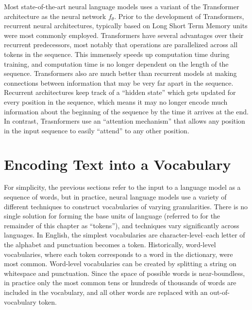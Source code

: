 Most state-of-the-art neural language models uses a variant of the Transformer architecture \cite{vaswani2017attention} as the neural network $f_\theta$.
Prior to the development of Transformers, recurrent neural architectures, typically based on Long Short Term Memory units \citep{hochreiter1997long} were most commonly employed.
Transformers have several advantages over their recurrent predecessors, most notably that operations are parallelized across all tokens in the sequence.
This immensely speeds up computation time during training, and computation time is no longer dependent on the length of the sequence.
Transformers also are much better than recurrent models at making connections between information that may be very far apart in the sequence.
Recurrent architectures keep track of a ``hidden state'' which gets updated for every position in the sequence, which means it may no longer encode much information about the beginning of the sequence by the time it arrives at the end.
In contrast, Trasnformers use an ``attention mechanism'' that allows any position in the input sequence to easily ``attend'' to any other position.


\section{Encoding Text into a Vocabulary}

For simplicity, the previous sections refer to the input to a language model as a sequence of words, but in practice, neural language models use a variety of different techniques to construct vocabularies of varying granularities.
There is no single solution for forming the base units of language (referred to for the remainder of this chapter as ``tokens''), and techniques vary significantly across languages.
In English, the simplest vocabularies are character-level--each letter of the alphabet and punctuation becomes a token.
Historically, word-level vocabularies, where each token corresponds to a word in the dictionary, were most common.
Word-level vocabularies can be created by splitting a string on whitespace and punctuation.
Since the space of possible words is near-boundless, in practice only the most common tens or hundreds of thousands of words are included in the vocabulary, and all other words are replaced with an out-of-vocabulary token.

